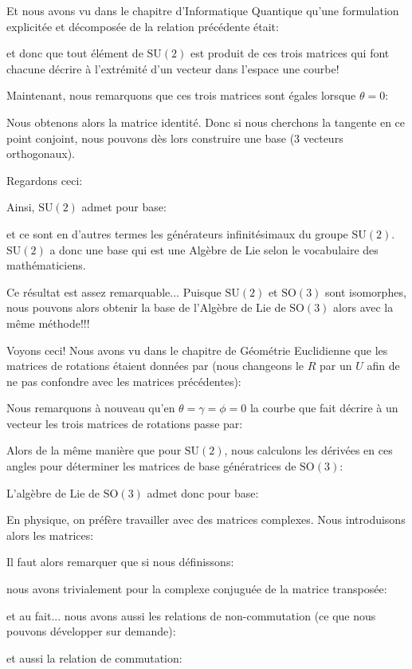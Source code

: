 	Et nous avons vu dans le chapitre d'Informatique Quantique qu'une formulation explicitée et décomposée de la relation précédente était:
	
	et donc que tout élément de $\text{SU}(2)$ est produit de ces trois matrices qui font chacune décrire à l'extrémité d'un vecteur dans l'espace une courbe!
	
	Maintenant, nous remarquons que ces trois matrices sont égales lorsque $\theta=0$:
	
	Nous obtenons alors la matrice identité. Donc si nous cherchons la tangente en ce point conjoint, nous pouvons dès lors construire une base ($3$ vecteurs orthogonaux).
	
	Regardons ceci:
	
	Ainsi,  $\text{SU}(2)$ admet pour base:
	
	et ce sont en d'autres termes les générateurs infinitésimaux du groupe $\text{SU}(2)$. $\text{SU}(2)$ a donc une base qui est une Algèbre de Lie selon le vocabulaire des mathématiciens.
	
	Ce résultat est assez remarquable... Puisque $\text{SU}(2)$ et $\text{SO}(3)$ sont isomorphes, nous pouvons alors obtenir la base de l'Algèbre de Lie de $\text{SO}(3)$ alors avec la même méthode!!!
	
	Voyons ceci! Nous avons vu dans le chapitre de Géométrie Euclidienne que les matrices de rotations étaient données par (nous changeons le $R$ par un $U$ afin de ne pas confondre avec les matrices précédentes):
	
	Nous remarquons à nouveau qu'en $\theta=\gamma=\phi=0$ la courbe que fait décrire à un vecteur les trois matrices de rotations passe par:
	
	Alors de la même manière que pour $\text{SU}(2)$, nous calculons les dérivées en ces angles pour déterminer les matrices de base génératrices de $\text{SO}(3)$:
	
	L'algèbre de Lie de $\text{SO} (3)$ admet donc pour base:
	
	En physique, on préfère travailler avec des matrices complexes. Nous introduisons alors les matrices:
	
	Il faut alors remarquer que si nous définissons:
	
	nous avons trivialement pour la complexe conjuguée de la matrice transposée:
	
	et au fait... nous avons aussi les relations de non-commutation (ce que nous pouvons développer sur demande):
	
	et aussi la relation de commutation:
	
